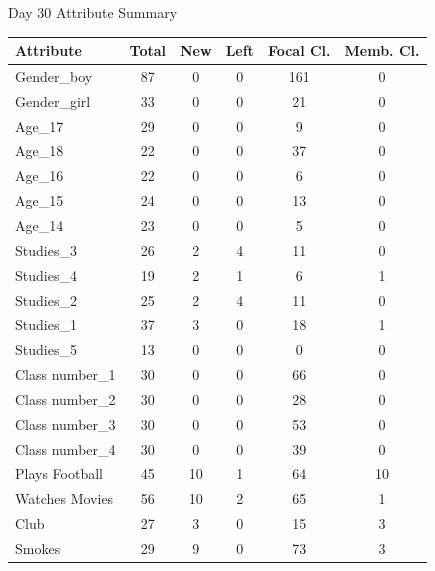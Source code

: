 \begin{question}
\begin{subquestion}
{		\begin{center}
			Day 30 Attribute Summary
						\begin{tabular}{lccccc}
				\hline
				Attribute          & Total & New & Left & Focal Cl. & Memb. Cl. \\ \hline
				Gender\_boy        & 87    & 0   & 0    & 161       & 0         \\
				Gender\_girl       & 33    & 0   & 0    & 21        & 0         \\
				Age\_17            & 29    & 0   & 0    & 9         & 0         \\
				Age\_18            & 22    & 0   & 0    & 37        & 0         \\
				Age\_16            & 22    & 0   & 0    & 6         & 0         \\
				Age\_15            & 24    & 0   & 0    & 13        & 0         \\
				Age\_14            & 23    & 0   & 0    & 5         & 0         \\
				Studies\_3         & 26    & 2   & 4    & 11        & 0         \\
				Studies\_4         & 19    & 2   & 1    & 6         & 1         \\
				Studies\_2         & 25    & 2   & 4    & 11        & 0         \\
				Studies\_1         & 37    & 3   & 0    & 18        & 1         \\
				Studies\_5         & 13    & 0   & 0    & 0         & 0         \\
				Class number\_1    & 30    & 0   & 0    & 66        & 0         \\
				Class number\_2    & 30    & 0   & 0    & 28        & 0         \\
				Class number\_3    & 30    & 0   & 0    & 53        & 0         \\
				Class number\_4    & 30    & 0   & 0    & 39        & 0         \\
				Plays Football     & 45    & 10  & 1    & 64        & 10        \\
				Watches Movies     & 56    & 10  & 2    & 65        & 1         \\
				Club               & 27    & 3   & 0    & 15        & 3         \\
				Smokes             & 29    & 9   & 0    & 73        & 3         \\ \hline
			\end{tabular}
		\end{center}
		
}
\end{subquestion}
\end{question}
